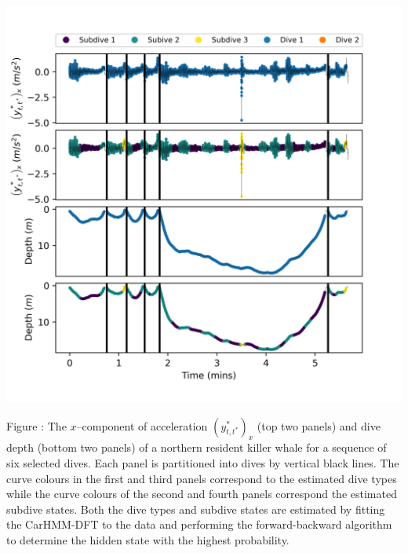 \documentclass{article}
\begin{document}
        \begin{center}
        \includegraphics[width=6in]{../Plots/2019/20190902-182840-CATs_OB_1_0_267_CarHMM_decoded_dives.png}
        \end{center}
        
        \noindent Figure : The $x$--component of acceleration $(y^*_{t,t^*})_x$ (top two panels) and dive depth (bottom two panels) of a northern resident killer whale for a sequence of six selected dives. Each panel is partitioned into dives by vertical black lines. The curve colours in the first and third panels correspond to the estimated dive types while the curve colours of the second and fourth panels correspond the estimated subdive states. Both the dive types and subdive states are estimated by fitting the CarHMM-DFT to the data and performing the forward-backward algorithm to determine the hidden state with the highest probability.
        \addtocounter{fignum}{1}
        
\end{document}
